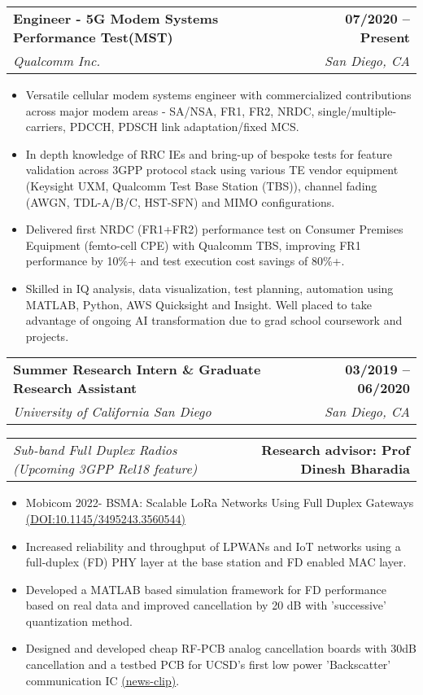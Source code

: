 \documentclass[letterpaper,11pt]{article}
\makeatletter
\newcommand{\resumeItem}[1]{
  \item\small{
    {#1 \vspace{-2pt}}
  }
}
\newcommand{\resumeSubheading}[4]{
  \vspace{-2pt}\item
    \begin{tabular*}{1.0\textwidth}[t]{l@{\extracolsep{\fill}}r}
      \textbf{#1} & \textbf{\small #2} \\
      \textit{\small#3} & \textit{\small #4} \\
    \end{tabular*}\vspace{-7pt}
}
\newcommand{\resumeProjectHeading}[2]{
    \item
    \begin{tabular*}{1.001\textwidth}{l@{\extracolsep{\fill}}r}
      \small#1 & \textbf{\small #2}\\
    \end{tabular*}\vspace{-7pt}
}
\newcommand{\resumeItemListStart}{\begin{itemize}}
\newcommand{\resumeItemListEnd}{\end{itemize}\vspace{-5pt}}
\makeatother
\begin{document}
    \resumeSubheading
      {Engineer - 5G Modem Systems Performance Test(MST)}{07/2020 -- Present}
      {Qualcomm Inc.}{San Diego, CA}
      \resumeItemListStart
      \resumeItem{Versatile cellular modem systems engineer with commercialized contributions across major modem areas - SA/NSA, FR1, FR2, NRDC, single/multiple-carriers, PDCCH, PDSCH link adaptation/fixed MCS.}
        \resumeItem{In depth knowledge of RRC IEs and bring-up of bespoke tests for feature validation across 3GPP protocol stack using various TE vendor equipment (Keysight UXM, Qualcomm Test Base Station (TBS)), channel fading (AWGN, TDL-A/B/C, HST-SFN) and MIMO configurations.}
        \resumeItem{Delivered first NRDC (FR1+FR2) performance test on Consumer Premises Equipment (femto-cell CPE) with Qualcomm TBS, improving FR1 performance by 10\%+ and test execution cost savings of 80\%+.}
        \resumeItem{Skilled in IQ analysis, data visualization, test planning, automation using MATLAB, Python, AWS Quicksight and Insight. Well placed to take advantage of ongoing AI transformation due to grad school coursework and projects.}
      \resumeItemListEnd
    \resumeSubheading
      {Summer Research Intern \& Graduate Research Assistant}{03/2019 -- 06/2020}
      {University of California San Diego}{San Diego, CA}
      \vspace{-20pt}
      \resumeProjectHeading
          {\textit{\small Sub-band Full Duplex Radios (Upcoming 3GPP Rel18 feature)}}{Research advisor: Prof Dinesh Bharadia}
      \resumeItemListStart
        \resumeItem{Mobicom 2022- BSMA: Scalable LoRa Networks Using Full Duplex Gateways \href{https://rohit1347.github.io/AboutMe/mobicom22-final738.pdf}{(DOI:10.1145/3495243.3560544)}}
        \resumeItem{Increased reliability and throughput of LPWANs and IoT networks using a full-duplex (FD) PHY layer at the base station and FD enabled MAC layer.}
        \resumeItem{Developed a MATLAB based simulation framework for FD performance based on real data and improved cancellation by 20 dB with 'successive' quantization method.}
        \resumeItem{Designed and developed cheap RF-PCB analog cancellation boards with 30dB cancellation and a testbed PCB for UCSD’s first low power 'Backscatter' communication IC \href{https://rohit1347.github.io/AboutMe/NewChipBringsUltra-LowPowerWiFiConnectivitytoIoTDevices.pdf}{(news-clip)}.}
    \resumeItemListEnd
    
\end{document}
